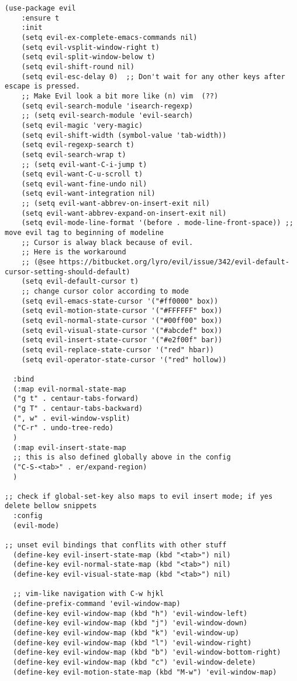 \documentclass[11pt]{article}
\begin{document}
\begin{verbatim}
(use-package evil
    :ensure t
    :init
    (setq evil-ex-complete-emacs-commands nil)
    (setq evil-vsplit-window-right t)
    (setq evil-split-window-below t)
    (setq evil-shift-round nil)
    (setq evil-esc-delay 0)  ;; Don't wait for any other keys after escape is pressed.
    ;; Make Evil look a bit more like (n) vim  (??)
    (setq evil-search-module 'isearch-regexp)
    ;; (setq evil-search-module 'evil-search)
    (setq evil-magic 'very-magic)
    (setq evil-shift-width (symbol-value 'tab-width))
    (setq evil-regexp-search t)
    (setq evil-search-wrap t)
    ;; (setq evil-want-C-i-jump t)
    (setq evil-want-C-u-scroll t)
    (setq evil-want-fine-undo nil)
    (setq evil-want-integration nil)
    ;; (setq evil-want-abbrev-on-insert-exit nil)
    (setq evil-want-abbrev-expand-on-insert-exit nil)
    (setq evil-mode-line-format '(before . mode-line-front-space)) ;; move evil tag to beginning of modeline
    ;; Cursor is alway black because of evil.
    ;; Here is the workaround
    ;; (@see https://bitbucket.org/lyro/evil/issue/342/evil-default-cursor-setting-should-default)
    (setq evil-default-cursor t)
    ;; change cursor color according to mode
    (setq evil-emacs-state-cursor '("#ff0000" box))
    (setq evil-motion-state-cursor '("#FFFFFF" box))
    (setq evil-normal-state-cursor '("#00ff00" box))
    (setq evil-visual-state-cursor '("#abcdef" box))
    (setq evil-insert-state-cursor '("#e2f00f" bar))
    (setq evil-replace-state-cursor '("red" hbar))
    (setq evil-operator-state-cursor '("red" hollow))

  :bind
  (:map evil-normal-state-map
  ("g t" . centaur-tabs-forward)
  ("g T" . centaur-tabs-backward)
  (", w" . evil-window-vsplit)
  ("C-r" . undo-tree-redo)
  )
  (:map evil-insert-state-map
  ;; this is also defined globally above in the config
  ("C-S-<tab>" . er/expand-region)
  )

;; check if global-set-key also maps to evil insert mode; if yes delete bellow snippets
  :config
  (evil-mode)

;; unset evil bindings that conflits with other stuff
  (define-key evil-insert-state-map (kbd "<tab>") nil)
  (define-key evil-normal-state-map (kbd "<tab>") nil)
  (define-key evil-visual-state-map (kbd "<tab>") nil)

  ;; vim-like navigation with C-w hjkl
  (define-prefix-command 'evil-window-map)
  (define-key evil-window-map (kbd "h") 'evil-window-left)
  (define-key evil-window-map (kbd "j") 'evil-window-down)
  (define-key evil-window-map (kbd "k") 'evil-window-up)
  (define-key evil-window-map (kbd "l") 'evil-window-right)
  (define-key evil-window-map (kbd "b") 'evil-window-bottom-right)
  (define-key evil-window-map (kbd "c") 'evil-window-delete)
  (define-key evil-motion-state-map (kbd "M-w") 'evil-window-map)


\end{verbatim}
\end{document}
